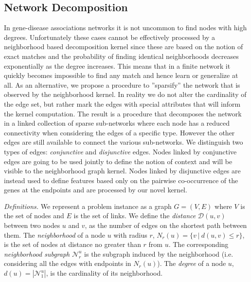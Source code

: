 \documentclass[review]{elsarticle}
\begin{document}
\subsection{Network Decomposition} 
In gene-disease associations networks it is not uncommon to find nodes with high degrees. Unfortunately these cases cannot be effectively processed by a neighborhood based decomposition kernel since these are based on the notion of exact matches and the probability of finding identical neighborhoods decreases exponentially as the degree increases. This means that in a finite network it quickly becomes impossible to find any match and hence learn or generalize at all. As an alternative, we propose a procedure to ''sparsify'' the network that is observed by the neighborhood kernel. In reality we do not alter the cardinality of the edge set, but rather mark the edges with special attributes that will inform the kernel computation. The result is a procedure that decomposes the network in a linked collection of sparse sub-networks where each node has a reduced connectivity when considering the edges of a specific type. However the other edges are still available to connect the various sub-networks. We distinguish two types of edges: {\em conjunctive} and {\em disjunctive} edges. Nodes linked by conjunctive edges are going to be used jointly to define the notion of context and will be visible to the neighborhood graph kernel. Nodes linked by disjunctive edges are instead used to define features based only on the pairwise co-occurrence of the genes at the endpoints and are processed by our novel kernel.

\textit{Definitions.} 
We represent a problem instance as a graph $G=(V,E)$ where $V$ is the set of nodes and $E$ is the set of links.
We define the \textit{distance} $\mathcal{D}(u,v)$ between two nodes $u$ and $v$, as the number of edges on the shortest path between them. The \textit{neighborhood} of a node $u$ with radius $r$, $N_r(u) = \lbrace v\ |\ d(u,v) \leq r \rbrace$, is the set of nodes at distance no greater than $r$ from $u$. The corresponding \textit{neighborhood subgraph} $\mathcal{N}_{r}^{u}$ is the  subgraph induced by the neighborhood (i.e. considering all the edges with endpoints in $N_r(u)$). The \textit{degree} of a node $u$, $d(u) = |\mathcal{N}_{1}^{u}|$, is the cardinality of its neighborhood. 
\end{document}
